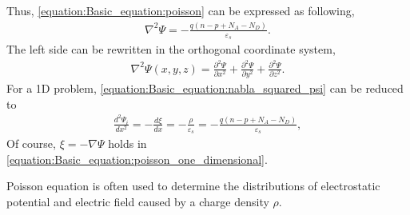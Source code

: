 \documentclass[letterpaper,10pt,english]{sphinxmanual}
\begin{document}
\sphinxAtStartPar
Thus, \eqref{equation:Basic_equation:poisson} can be expressed as following,
\begin{equation}\label{equation:Basic_equation:poisson_electric_charge}
\begin{split}\nabla^2\Psi = -\frac{q(n - p + N_A - N_D)}{\varepsilon_s}.\end{split}
\end{equation}
\sphinxAtStartPar
The left side can be rewritten in the orthogonal coordinate system,
\begin{equation}\label{equation:Basic_equation:nabla_squared_psi}
\begin{split}\nabla^2\Psi(x, y, z) = \frac{\partial^2\Psi}{\partial x^2} + \frac{\partial^2\Psi}{\partial y^2} + \frac{\partial^2\Psi}{\partial z^2}.\end{split}
\end{equation}
\sphinxAtStartPar
For a 1D problem, \eqref{equation:Basic_equation:nabla_squared_psi} can be reduced to
\begin{equation}\label{equation:Basic_equation:poisson_one_dimensional}
\begin{split}\frac{d^2\Psi_i}{d x^2} = -\frac{d\xi}{dx} = -\frac{\rho}{\varepsilon_s} =  -\frac{q(n - p + N_A - N_D)}{\varepsilon_s},\end{split}
\end{equation}
\sphinxAtStartPar
Of course, \(\xi = - \nabla\Psi\) holds in \eqref{equation:Basic_equation:poisson_one_dimensional}.

\sphinxAtStartPar
Poisson equation is often used to determine the distributions of electrostatic potential and electric field caused by a charge density \(\rho\).
\end{document}
